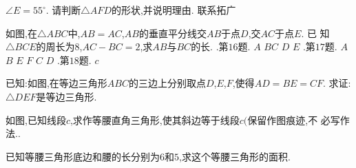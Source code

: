 \documentclass[cn,blue,12pt]{elegantbook}
\begin{document}
\begin{liti}[resume]
\( \angle E = 55 ^\circ \). 请判断\( \triangle AFD \)的形状,并说明理由. 
联系拓广
\item 如图,在\( \triangle ABC \)中,\( AB = AC\),\( AB \)的垂直平分线交\( AB \)于点\( D\),交\( AC \)于点\( E\). 已
知\( \triangle BCE \)的周长为\( 8\),\( AC - BC = 2\),求\( AB \)与\( BC \)的长. 
.第\( 16 \)题.
\(A\)
\(B C\)
\(D\)
\(E\)
.第\( 17 \)题.
\(A\)
\(B\)
\(E\)
\(F\)
\(C\)
\(D\)
.第\( 18 \)题.
\(c\)
\item 已知:如图,在等边三角形\( ABC \)的三边上分别取点\( D\),\( E\),\( F\),使得\( AD = BE = CF\). 
求证:\( \triangle DEF \)是等边三角形. 
\item 如图,已知线段\( c\),求作等腰直角三角形,使其斜边等于线段\( c( \)保留作图痕迹,不
必写作法.. 
\item 已知等腰三角形底边和腰的长分别为\( 6 \)和\( 5\),求这个等腰三角形的面积. 
\end{liti}
\end{document}

